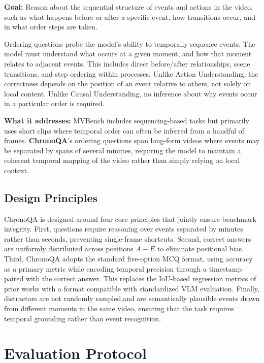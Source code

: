 \documentclass[sigconf,natbib=false,nonacm]{acmart}
\begin{document}
\textbf{Goal:} Reason about the sequential structure of events and actions in the video, such as what happens before or after a specific event, how transitions occur, and in what order steps are taken.

Ordering questions probe the model's ability to temporally sequence events. The model must understand what occurs at a given moment, and how that moment relates to adjacent events. This includes direct before/after relationships, scene transitions, and step ordering within processes. Unlike Action Understanding, the correctness depends on the position of an event relative to others, not solely on local content. Unlike Causal Understanding, no inference about why events occur in a particular order is required.

\textbf{What it addresses:} MVBench \cite{mvbench} includes sequencing-based tasks but primarily uses short clips where temporal order can often be inferred from a handful of frames. \textbf{ChronoQA}'s ordering questions span long-form videos where events may be separated by spans of several minutes, requiring the model to maintain a coherent temporal mapping of the video rather than simply relying on local context.
 

\subsection{Design Principles}

ChronoQA is designed around four core principles that jointly ensure benchmark integrity. First, questions require reasoning over events separated by minutes rather than seconds, preventing single-frame shortcuts. Second, correct answers are uniformly distributed across positions $A-E$ to eliminate positional bias. Third, ChronoQA adopts the standard five-option MCQ format, using accuracy as a primary metric while encoding temporal precision through a timestamp paired with the correct answer. This replaces the IoU-based regression metrics of prior works with a format compatible with standardized VLM evaluation. Finally, distractors are not randomly sampled,and are semantically plausible events drawn from different moments in the same video, ensuring that the task requires temporal grounding rather than event recognition.

\section{Evaluation Protocol}
\end{document}
